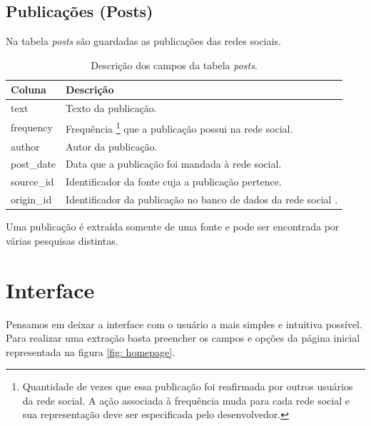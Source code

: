 \subsection{Publicações (Posts)}
\label{subsec: Posts}
Na tabela \textit{posts} são guardadas as publicações das redes sociais.
\begin{table}[ht]
    \begin{tabular}{|p{3cm}|p{12cm}|}
        \hline
        \rowcolor[HTML]{CFCFCF} 
        Coluna      & Descrição  \\ \hline
        text        & Texto da publicação. \\ \hline 
        frequency   & Frequência \footnote{Quantidade de vezes que essa publicação foi reafirmada por outros usuários da rede social. A ação associada à frequência muda para cada rede social e sua representação deve ser especificada pelo desenvolvedor.} que a publicação possui na rede social. \\ \hline 
        author      & Autor da publicação. \\ \hline 
        post\_date  & Data que a publicação foi mandada à rede social. \\ \hline 
        source\_id  & Identificador da fonte cuja a publicação pertence. \\ \hline 
        origin\_id  & Identificador da publicação no banco de dados da rede social . \\ \hline 
    \end{tabular}
    \caption{Descrição dos campos da tabela \textit{posts}.}
    \label{fig: DescricaoTabelaPublicacao}
\end{table}

Uma publicação é extraída somente de uma fonte e pode ser encontrada por várias pesquisas distintas.



\section{Interface}
\label{sec: Interface}

Pensamos em deixar a interface com o usuário a mais simples e intuitiva possível.  Para realizar uma extração basta preencher os campos e opções da página inicial representada na figura \ref{fig: homepage}.

